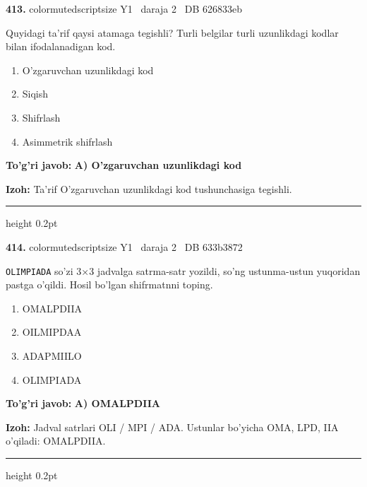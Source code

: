 \documentclass[10pt,a4paper,oneside]{article}
\begin{document}
\noindent\textbf{\color{ink}413.}  {color{muted}scriptsize Y1 \textbullet\ daraja 2 \textbullet\ DB 626833eb}
\par
Quyidagi ta'rif qaysi atamaga tegishli? Turli belgilar turli uzunlikdagi kodlar bilan ifodalanadigan kod.
\begin{enumerate}[label=\Alph*),leftmargin=9mm]
\item O'zgaruvchan uzunlikdagi kod
\item Siqish
\item Shifrlash
\item Asimmetrik shifrlash
\end{enumerate}
\begin{tcolorbox}[enhanced,breakable,colback=teal!4,colframe=teal!50!black,boxrule=0.5pt,arc=1.1mm,left=3mm,right=3mm,top=1.7mm,bottom=1.7mm,before skip=2mm,after skip=2mm]
\textbf{\color{teal}To'g'ri javob:} \textbf{A) O'zgaruvchan uzunlikdagi kod}
\par\smallskip
\textbf{Izoh:} Ta'rif O'zgaruvchan uzunlikdagi kod tushunchasiga tegishli.
\end{tcolorbox}
\vspace{2mm}\hrule height 0.2pt \vspace{3mm}

\noindent\textbf{\color{ink}414.}  {color{muted}scriptsize Y1 \textbullet\ daraja 2 \textbullet\ DB 633b3872}
\par
\texttt{OLIMPIADA} so'zi 3\ensuremath{\times}3 jadvalga satrma-satr yozildi, so'ng ustunma-ustun yuqoridan pastga o'qildi. Hosil bo'lgan shifrmatnni toping.
\begin{enumerate}[label=\Alph*),leftmargin=9mm]
\item OMALPDIIA
\item OILMIPDAA
\item ADAPMIILO
\item OLIMPIADA
\end{enumerate}
\begin{tcolorbox}[enhanced,breakable,colback=teal!4,colframe=teal!50!black,boxrule=0.5pt,arc=1.1mm,left=3mm,right=3mm,top=1.7mm,bottom=1.7mm,before skip=2mm,after skip=2mm]
\textbf{\color{teal}To'g'ri javob:} \textbf{A) OMALPDIIA}
\par\smallskip
\textbf{Izoh:} Jadval satrlari OLI / MPI / ADA. Ustunlar bo'yicha OMA, LPD, IIA o'qiladi: OMALPDIIA.
\end{tcolorbox}
\vspace{2mm}\hrule height 0.2pt \vspace{3mm}
\end{document}
